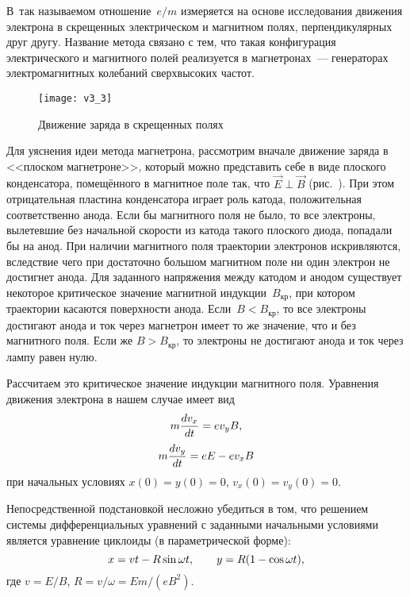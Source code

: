 В~так называемом {} отношение~$e/m$ измеряется на
основе исследования движения электрона в скрещенных электрическом и магнитном
полях, перпендикулярных друг другу. Название метода связано с тем, что такая
конфигурация электрического и магнитного полей реализуется в магнетронах~---
генераторах электромагнитных колебаний
сверхвысоких частот.

\begin{figure}[h!]
    \texttt{[image: v3\_3]}
    \caption{Движение заряда в скрещенных полях}
\end{figure}

Для уяснения идеи метода магнетрона, рассмотрим вначале движение заряда в
<<плоском магнетроне>>, который можно
представить себе в виде плоского конденсатора, помещённого в магнитное поле так,
что $\vec{E}\perp\vec{B}$ (рис.~). При этом отрицательная
пластина конденсатора играет роль катода, положительная соответственно анода.
Если бы магнитного поля не было, то все электроны, вылетевшие без начальной
скорости из катода такого плоского диода, попадали бы на анод. При наличии
магнитного поля траектории электронов искривляются, вследствие чего при
достаточно большом магнитном поле ни один электрон не достигнет анода. Для
заданного напряжения между катодом и анодом существует некоторое критическое
значение магнитной индукции~$B_\text{кр}$, при котором траектории касаются
поверхности анода. Если~$B<B_\text{кр}$, то все электроны достигают анода и ток
через магнетрон имеет то же значение, что и без магнитного поля. Если же
$B>B_\text{кр}$, то электроны не достигают анода и ток через лампу равен нулю.

Рассчитаем это критическое значение индукции магнитного поля. Уравнения движения
электрона в нашем случае имеет вид
\begin{equation}
    \eqmark{3.9}
    m\frac{dv_x}{dt}=ev_y B,
\end{equation}
\begin{equation}
    \eqmark{3.10}
    m\frac{dv_y}{dt}=eE-ev_x B
\end{equation}
при начальных условиях $x(0)=y(0)=0$, $v_x(0)=v_y(0)=0$.

Непосредственной подстановкой несложно убедиться в том, что решением системы
дифференциальных уравнений с заданными
начальными условиями является уравнение циклоиды (в параметрической форме):
\begin{equation}
    \eqmark{3.11}
    x = vt - R\sin\omega t,\qquad y = R(1-\cos\omega t),
\end{equation}
где $ v=E/B$, $R=v/\omega=Em/(eB^2)$.

